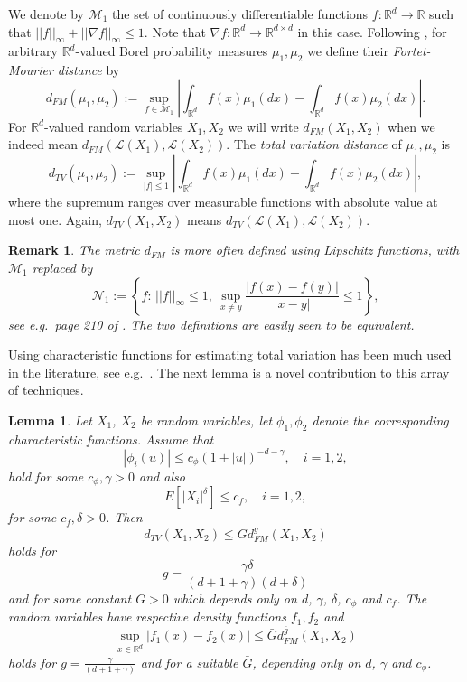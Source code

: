 \documentclass{article}
\newtheorem{lemma}[theorem]{Lemma}
\newtheorem{remark}[theorem]{Remark}
\begin{document}
We denote by $\mathcal{M}_{1}$ the set of continuously differentiable functions $f:\mathbb{R}^{d}\to\mathbb{R}$
such that $||f||_{\infty}+||\nabla f||_{\infty}\leq 1$. Note that $\nabla f:\mathbb{R}^{d}\to\mathbb{R}^{d\times d}$ in this
case. Following \cite{bally,bc1}, for arbitrary $\mathbb{R}^{d}$-valued Borel probability measures $\mu_{1},\mu_{2}$ 
we define their \emph{Fortet-Mourier distance} by 
$$
d_{FM}(\mu_{1},\mu_{2}):=\sup_{f\in\mathcal{M}_{1}}\left|\int_{\mathbb{R}^{d}}f(x)\mu_{1}(dx)-\int_{\mathbb{R}^{d}}f(x)\mu_{2}(dx)\right|.
$$
For $\mathbb{R}^{d}$-valued random variables $X_{1},X_{2}$ we will write $d_{FM}(X_{1},X_{2})$ when we indeed mean $d_{FM}(\mathcal{L}(X_{1}),
\mathcal{L}(X_{2}))$. 
The \emph{total variation distance} of $\mu_{1},\mu_{2}$ is
$$
d_{TV}(\mu_{1},\mu_{2}):=\sup_{|f|\leq 1}\left|\int_{\mathbb{R}^{d}}f(x)\mu_{1}(dx)-\int_{\mathbb{R}^{d}}f(x)\mu_{2}(dx)\right|,
$$
where the supremum ranges over measurable functions with absolute value at most one. Again, $d_{TV}(X_{1},X_{2})$ means
$d_{TV}(\mathcal{L}(X_{1}),
\mathcal{L}(X_{2}))$.

\begin{remark}{\rm The metric $d_{FM}$ is more often defined using Lipschitz functions, with $\mathcal{M}_{1}$ replaced by 
$$
\mathcal{N}_{1}:=\left\{f:\, ||f||_{\infty}\leq 1,\ \sup_{x\neq y}\frac{|f(x)-f(y)|}{|x-y|}\leq 1\right\},
$$
see e.g.\ page 210 of \cite{nourdin-peccati}. The two definitions are easily seen to be equivalent.
}
\end{remark}

Using characteristic functions for estimating total variation has been much used in the 
literature, see e.g.\ \cite{bobkov,bcg}. The next lemma is a novel contribution to this array of
techniques.

\begin{lemma}\label{withrate}
Let $X_{1}$, $X_{2}$ be random variables, let $\phi_{1},\phi_{2}$ denote the corresponding
characteristic functions. Assume that
\begin{equation}\label{fi}
|\phi_{i}(u)|\leq c_{\phi}(1+|u|)^{-d-\gamma},\quad i=1,2,	
\end{equation}
hold for some $c_{\phi},\gamma>0$ and also
\begin{equation}\label{ef}
E[|X_{i}|^{\delta}]\leq c_{f},\quad i=1,2,	
\end{equation}
for some $c_{f},\delta>0$. Then
\begin{equation}\label{alenyeg}
d_{TV}(X_{1},X_{2})\leq G d_{FM}^{g}(X_{1},X_{2})	
\end{equation}
holds for 
$$
g=\frac{\gamma\delta}{(d+1+\gamma)(d+\delta)}
$$
and for some constant $G>0$ which depends only on $d$, $\gamma$, $\delta$, $c_{\phi}$ and $c_{f}$. 
The random variables have respective density functions $f_{1},f_{2}$ and
\begin{equation}\label{sup}
\sup_{x\in\mathbb{R}^{d}}|f_{1}(x)-f_{2}(x)|\leq \bar{G} d_{FM}^{\bar{g}}(X_{1},X_{2})
\end{equation}
holds for $\bar{g}=\frac{\gamma}{(d+1+\gamma)}$ and for a suitable $\bar{G}$, depending only
on $d$, $\gamma$ and $c_{\phi}$.
\end{lemma}
\end{document}
